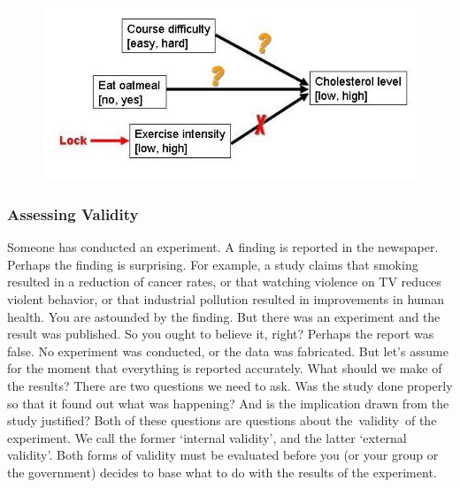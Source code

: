 \begin{refsection}
\begin{figure}[htbp]
\centering
\includegraphics[keepaspectratio,width=\textwidth,height=0.75\textheight]{causaldiagramsexperimentaddfactor.jpg}
\label{causaldiagramsexperimentaddfactor.jpg}
\end{figure}

\subsubsection{Assessing Validity}
\label{assessingvalidity}

Someone has conducted an experiment. A finding is reported in the newspaper. Perhaps the finding is surprising. For example, a study claims that smoking resulted in a reduction of cancer rates, or that watching violence on TV reduces violent behavior, or that industrial pollution resulted in improvements in human health. You are astounded by the finding. But there was an experiment and the result was published. So you ought to believe it, right?
Perhaps the report was false. No experiment was conducted, or the data was fabricated. But let's assume for the moment that everything is reported accurately. What should we make of the results? There are two questions we need to ask. Was the study done properly so that it found out what was happening? And is the implication drawn from the study justified? Both of these questions are questions about the validity of the experiment. We call the former `internal validity', and the latter `external validity'. Both forms of validity must be evaluated before you (or your group or the government) decides to base what to do with the results of the experiment.


\end{refsection}
